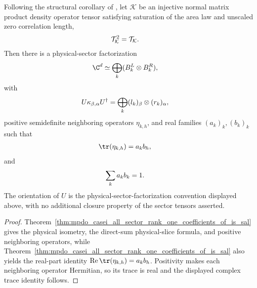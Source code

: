\begin{corollary}
    \label{cor:mpdo_sal_zcl_local_sector_structure}
    \leanok
    Following the structural corollary of
    \cite[Appendix~C.2, lines~1503--1506]{Cirac2016MPDO_arXiv}, let $\mathcal K$
    be an injective normal matrix product density operator
    tensor satisfying saturation of the area law and unscaled zero correlation length,
    \begin{align}
        \mathcal T_{\mathcal K}^2 & =\mathcal T_{\mathcal K}.
        \notag
    \end{align}
    Then there is a physical-sector factorization
    \begin{align}
        \C^d & \simeq\bigoplus_k(B_k^L\otimes B_k^R),
        \notag
    \end{align}
    with
    \begin{align}
        U\kappa_{\beta,\alpha}U^\dagger
         & =\bigoplus_k(l_k)_\beta\otimes(r_k)_\alpha,
        \notag
    \end{align}
    positive semidefinite neighboring operators $\eta_{k,h}$, and real
    families $(a_k)_k,(b_k)_k$ such that
    \begin{align}
        \tr(\eta_{k,h}) & =a_kb_h,
        \notag
    \end{align}
    and
    \begin{align}
        \sum_k a_kb_k & =1.
        \notag
    \end{align}
    The orientation of $U$ is the physical-sector-factorization convention
    displayed above, with no additional closure property of the sector tensors
    asserted.
\end{corollary}

\begin{proof}
    \leanok
    Theorem~\ref{thm:mpdo_casei_all_sector_rank_one_coefficients_of_is_sal}
    gives the physical isometry, the
    direct-sum physical-slice formula, and positive neighboring operators, while
    Theorem~\ref{thm:mpdo_casei_all_sector_rank_one_coefficients_of_is_sal}
    also yields the real-part identity
    $\operatorname{Re}\tr(\eta_{k,h})=a_kb_h$. Positivity makes each
    neighboring operator Hermitian, so its trace is real and the displayed
    complex trace identity follows.
\end{proof}

